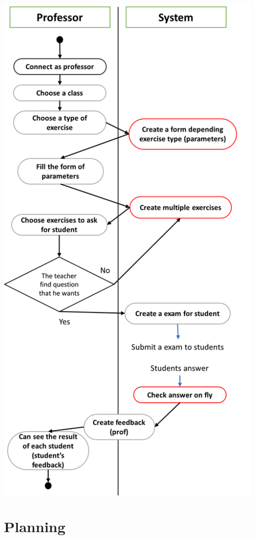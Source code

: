 \documentclass{article}
\begin{document}
\begin{center}
    \includegraphics[height=.8\textheight]{profAD.png}
\end{center}


\section{Planning}
\end{document}
